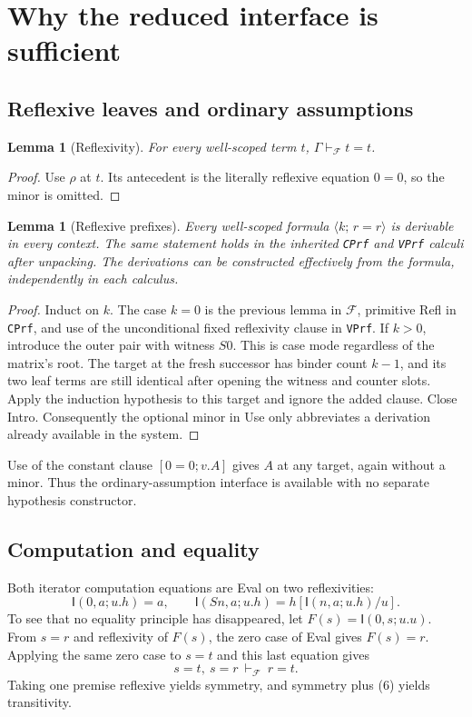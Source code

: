 \documentclass[11pt]{article}
\newtheorem{lemma}[theorem]{Lemma}
\theoremstyle{definition}\newtheorem{definition}[theorem]{Definition}
\theoremstyle{remark}\newtheorem{remark}[theorem]{Remark}
\newcommand{\I}{\mathsf I}
\newcommand{\F}{\mathcal F}
\newcommand{\Eq}[3]{\langle #1;\,#2=#3\rangle}
\newcommand{\code}[1]{\texttt{#1}}
\begin{document}
\section{Why the reduced interface is sufficient}

\subsection{Reflexive leaves and ordinary assumptions}
\label{sec:reflexive}

\begin{lemma}[Reflexivity]
For every well-scoped term $t$, $\Gamma\vdash_\F t=t$.
\end{lemma}
\begin{proof}
Use $\rho$ at $t$. Its antecedent is the literally reflexive equation
$0=0$, so the minor is omitted.
\end{proof}

\begin{lemma}[Reflexive prefixes]
Every well-scoped formula $\Eq{k}{r}{r}$ is derivable in every context.
The same statement holds in the inherited \code{CPrf} and \code{VPrf}
calculi after unpacking. The derivations can be constructed effectively
from the formula, independently in each calculus.
\end{lemma}
\begin{proof}
Induct on $k$. The case $k=0$ is the previous lemma in $\F$, primitive
Refl in \code{CPrf}, and use of the unconditional fixed reflexivity clause
in \code{VPrf}. If $k>0$, introduce
the outer pair with witness $S0$. This is case mode regardless of the
matrix's root. The target at the fresh successor has binder count $k-1$,
and its two leaf terms are still identical after opening the witness and
counter slots. Apply the induction hypothesis to this target and ignore
the added clause. Close Intro. Consequently the optional minor in Use
only abbreviates a derivation already available in the system.
\end{proof}

Use of the constant clause $[0=0;v.A]$ gives $A$ at any target, again
without a minor. Thus the ordinary-assumption interface is available with
no separate hypothesis constructor.

\subsection{Computation and equality}

Both iterator computation equations are Eval on two reflexivities:
\[
 \I(0,a;u.h)=a,\qquad
 \I(Sn,a;u.h)=h[\I(n,a;u.h)/u].
 \tag{5}\label{eq:compute}
\]
To see that no equality principle has disappeared, let
$F(s)=\I(0,s;u.u)$. From $s=r$ and reflexivity of $F(s)$, the zero case
of Eval gives $F(s)=r$. Applying the same zero case to $s=t$ and this
last equation gives
\[
 s=t,\ s=r\ \vdash_\F\ r=t.
 \tag{6}\label{eq:join}
\]
Taking one premise reflexive yields symmetry, and symmetry plus (6)
yields transitivity.
\end{document}
